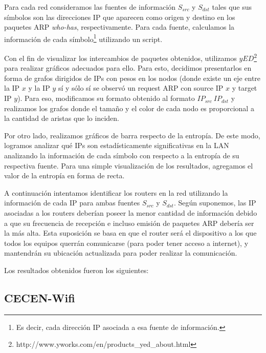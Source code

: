 \documentclass[10pt, a4paper]{article}
\begin{document}
Para cada red consideramos las fuentes de información $S_{src}$ y $S_{dst}$ tales que sus símbolos son las direcciones IP que aparecen como origen y destino en los paquetes ARP \textit{who-has}, respectivamente. Para cada fuente, calculamos la información de cada símbolo\footnote{Es decir, cada dirección IP asociada a esa fuente de información.} utilizando un script.

Con el fin de visualizar los intercambios de paquetes obtenidos, utilizamos $yED$\footnote{http://www.yworks.com/en/products\_yed\_about.html} para realizar gráficos adecuados para ello. Para esto, decidimos presentarlos en forma de grafos dirigidos de IPs con pesos en los nodos (donde existe un eje entre la IP $x$ y la IP $y$ sí y sólo sí se observó un request ARP con source IP $x$ y target IP $y$). Para eso, modificamos su formato obtenido al formato $IP_{src}\ IP_{dst}$ y realizamos los grafos donde el tamaño y el color de cada nodo es proporcional a la cantidad de aristas que lo inciden.

Por otro lado, realizamos gráficos de barra respecto de la entropía. De este modo, logramos analizar qué IPs son estadísticamente significativas en la LAN analizando la información de cada símbolo con respecto a la entropía de su respectiva fuente. Para una simple visualización de los resultados, agregamos el valor de la entropía en forma de recta.

A continuación intentamos identificar los routers en la red utilizando la información de cada IP para ambas fuentes $S_{src}$ y $S_{dst}$. Según suponemos, las IP asociadas a los routers deberían poseer la menor cantidad de información debido a que su frecuencia de recepción e incluso emisión de paquetes ARP debería ser la más alta. Esta suposición se basa en que el router será el dispositivo a los que todos los equipos querrán comunicarse (para poder tener acceso a internet), y mantendrán su ubicación actualizada para poder realizar la comunicación.

Los resultados obtenidos fueron los siguientes:

\subsection{CECEN-Wifi}
\end{document}
